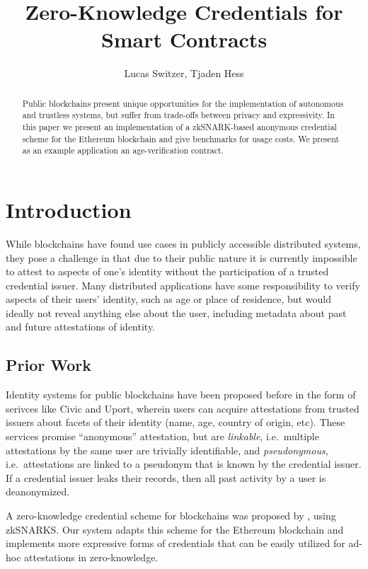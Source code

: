 \documentclass[11 pt]{extarticle}
\theoremstyle{remark}
\begin{document}
\onehalfspacing

\title{Zero-Knowledge Credentials for Smart Contracts}
\author{Lucas Switzer, Tjaden Hess}

\maketitle

\begin{abstract}
	Public blockchains present unique opportunities for the implementation of
	autonomous and trustless systems, but suffer from trade-offs between
	privacy and expressivity. In this paper we present an implementation of a
	zkSNARK-based
	anonymous credential scheme for the Ethereum blockchain and give
	benchmarks for usage costs. We present as an example application an
  age-verification contract.
\end{abstract}

\section{Introduction}
While blockchains have found use cases in publicly accessible distributed
systems, they pose a challenge in that due to their public nature it is
currently impossible to attest to aspects of one's identity without the
participation of a trusted credential issuer. Many distributed applications have
some responsibility to verify aspects of their users' identity, such as age or
place of residence, but would ideally not reveal anything else about the user,
including metadata about past and future attestations of identity.

\subsection{Prior Work}
Identity systems for public blockchains have been proposed before in the form of
serivces like Civic\cite{CivicSecureIdentity} and Uport\cite{braendgaardDifferentApproachesEthereum2018}, wherein users can acquire attestations from
trusted issuers about facets of their identity (name, age, country of origin,
etc). These services promise ``anonymous'' attestation, but are
\textit{linkable}, i.e.\ multiple attestations by the same user are trivially
identifiable, and \textit{pseudonymous}, i.e.\ attestations are
linked to a pseudonym that is known by the credential issuer. If a credential
issuer leaks their records, then all past activity by a user is deanonymized.

A zero-knowledge credential scheme for blockchains was proposed by
\citet{garmanDecentralizedAnonymousCredentials2013}, using zkSNARKS. Our system
adapts this scheme for the Ethereum\cite{woodEthereumSecureDecentralised2014} blockchain and implements more expressive
forms of credentials that can be easily utilized for ad-hoc attestations in zero-knowledge.
\end{document}
